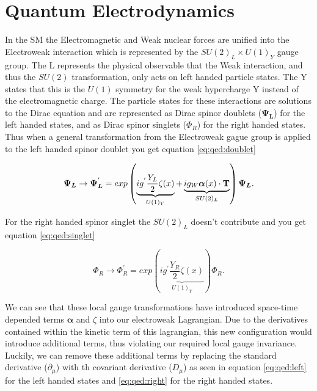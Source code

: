\section{Quantum Electrodynamics} \label{sec:theory:qed}

In the SM the Electromagnetic and Weak nuclear forces are unified into the
Electroweak interaction which is represented by the $SU(2)_L \times U(1)_Y$
gauge group. The L represents the physical observable that the Weak interaction,
and thus the $SU(2)$ transformation, only acts on left handed particle states.
The Y states that this is the $U(1)$ symmetry for the weak hypercharge Y instead
of the electromagnetic charge.  The particle states for these interactions are
solutions to the Dirac equation and are represented as Dirac spinor doublets
($\boldsymbol{\Psi_L}$) for the left handed states, and as Dirac spinor singlets
($\Phi_R$) for the right handed states.  Thus when a general transformation from
the Electroweak gague group is applied to the left handed spinor doublet you get
equation \ref{eq:qed:doublet}

\begin{equation} \label{eq:qed:doublet} 
\boldsymbol{\Psi_L} \rightarrow \boldsymbol{\Psi_L}^{'} = exp \left(
\underbrace{ ig^{'} \frac{Y_L}{2}
\zeta (x) }_{U(1)_Y} + \underbrace{ ig_{W} \boldsymbol{\alpha}(x) \cdot
\text{\bf{T}} }_{SU(2)_L} \right) \boldsymbol{\Psi_L}.
\end{equation}

For the right handed spinor singlet the $SU(2)_L$ doesn't contribute and
you get equation \ref{eq:qed:singlet}

\begin{equation} \label{eq:qed:singlet} 
{\Phi_R} \rightarrow \Phi_R^{'} = exp \left( \underbrace{ ig^{'} \frac{Y_R}{2}
\zeta (x) }_{U(1)_Y} \right) \Phi_R.
\end{equation}

We can see that these local gauge transformations have introduced space-time
depended terms $\boldsymbol{\alpha}$ and $\zeta$ into our electroweak
Lagrangian.  Due to the derivatives contained within the kinetic term of this
lagrangian, this new configuration would introduce additional terms, thus
violating our required local gauge invariance.  Luckily, we can remove these
additional terms by replacing the standard derivative ($\partial_{\mu}$) with th
covariant derivative ($D_{\mu}$) as seen in equation \ref{eq:qed:left} for the
left handed states and \ref{eq:qed:right} for the right handed states.

